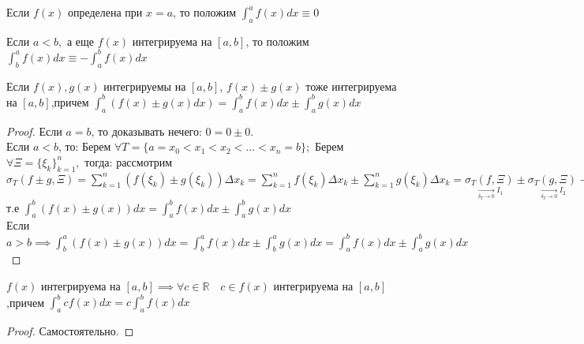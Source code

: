 \documentclass[../main.tex]{subfiles}
\begin{document}
\begin{definition}
    Если $f(x)$ определена при $x=a$, то положим $\int _{a}^{a}f(x)dx\equiv 0$
\end{definition}
\begin{definition}
    Если $a<b,$ а еще $f(x)$ интегрируема на $[a,b]$, то положим $\int _{b}^{a}f(x)dx\equiv - \int _{a}^{b}f(x)dx$
\end{definition}
\begin{theorem}
    Если $f(x),g(x)$ интегрируемы на $[a,b]$, $f(x)\pm g(x)$ тоже интегрируема на $[a,b]$,причем $\int _{a}^{b}(f(x)\pm g(x)dx)= \int _{a}^{b}f(x)dx \pm \int _{a}^{b} g(x)dx$
\end{theorem}
\begin{proof}
    Если $a=b$, то доказывать нечего: $0=0\pm 0.$\\ 
    Если $a<b$, то: Берем $\forall T=\{a=x_{0}<x_{1}<x_{2}<\dots<x_{n}=b\};$ Берем $\forall \Xi=\{\xi_{k}\}_{k=1}^{n},$ тогда: 
    рассмотрим $\sigma_{T}(f\pm g,\Xi)=\sum_{k=1}^{n}(f(\xi_{k})\pm g(\xi_{k}))\Delta x_{k} =\sum_{k=1}^{n}f(\xi_{k})\Delta x_{k} \pm  \sum_{k=1}^{n} g(\xi_{k})\Delta x_{k}=\underset{\underset{\delta_{T}\to 0}{\to} I_{1}}{\sigma_{T}(f,\Xi)} \pm  \underset{\underset{\delta_{T}\to 0}{\to} I_{2}}{\sigma_{T}(g, \Xi)}\to I_{1}+I_{2},$ т.е $\int _{a}^{b}(f(x)\pm g(x))dx=\int _{a}^{b}f(x)dx \pm  \int _{a}^{b}g(x)dx$\\ 
    Если $a>b \implies \int _{b}^{a}(f(x)\pm g(x))dx=\int _{b}^{a}f(x)dx\pm \int _{b}^{a}g(x)dx= \int _{a}^{b}f(x)dx\pm \int _{a}^{b}g(x)dx$
\end{proof}
\begin{theorem}
    $f(x)$ интегрируема на $[a,b]\implies\forall c\in\mathbb{R}\quad c\in f(x)\text{ интегрируема на }[a,b]$,причем $\int _{a}^{b}cf(x)dx=c \int _{a}^{b}f(x)dx$
\end{theorem}
\begin{proof}
    Самостоятельно.
\end{proof}
\end{document}
